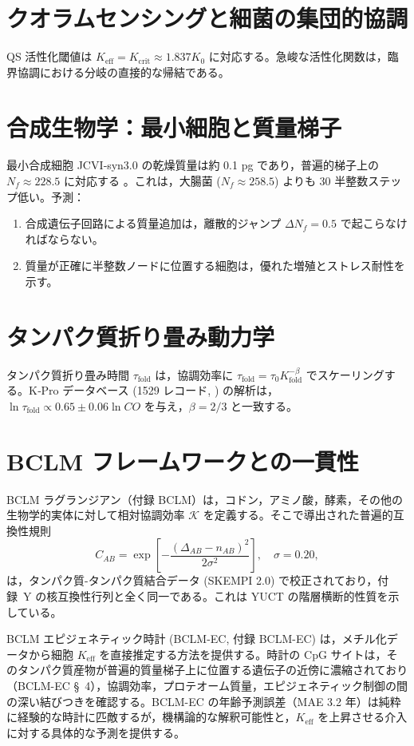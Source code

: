 \documentclass[11pt,a4paper]{article}
\newcommand{\REL}{\mathcal{K}}
\begin{document}
	\section{クオラムセンシングと細菌の集団的協調}
	
	QS 活性化閾値は \(K_{\text{eff}} = K_{\mathrm{crit}} \approx 1.837 K_0\) に対応する。急峻な活性化関数は，臨界協調における分岐の直接的な帰結である。
	
	\section{合成生物学：最小細胞と質量梯子}
	
	最小合成細胞 JCVI‑syn3.0 の乾燥質量は約 0.1 pg であり，普遍的梯子上の \(N_f \approx 228.5\) に対応する \cite{Hutchison2016, Pelletier2023}。これは，大腸菌 (\(N_f \approx 258.5\)) よりも 30 半整数ステップ低い。予測：
	\begin{enumerate}
		\item 合成遺伝子回路による質量追加は，離散的ジャンプ \(\Delta N_f = 0.5\) で起こらなければならない。
		\item 質量が正確に半整数ノードに位置する細胞は，優れた増殖とストレス耐性を示す。
	\end{enumerate}
	
	\section{タンパク質折り畳み動力学}
	
	タンパク質折り畳み時間 \(\tau_{\text{fold}}\) は，協調効率に \(\tau_{\text{fold}} = \tau_0 K_{\text{fold}}^{-\beta}\) でスケーリングする。K‑Pro データベース (1529 レコード, \cite{Turina2023}) の解析は，\(\ln \tau_{\text{fold}} \propto 0.65 \pm 0.06 \ln CO\) を与え，\(\beta=2/3\) と一致する。
	
	\section{BCLM フレームワークとの一貫性}
	
	BCLM ラグランジアン（付録 BCLM）は，コドン，アミノ酸，酵素，その他の生物学的実体に対して相対協調効率 \(\REL\) を定義する。そこで導出された普遍的互換性規則
	\[
	C_{AB} = \exp\!\left[-\frac{(\Delta_{AB}-n_{AB})^2}{2\sigma^2}\right],\quad \sigma=0.20,
	\]
	は，タンパク質-タンパク質結合データ (SKEMPI 2.0) で校正されており，付録~Y の核互換性行列と全く同一である。これは YUCT の階層横断的性質を示している。
	
	BCLM エピジェネティック時計 (BCLM-EC, 付録 BCLM-EC) は，メチル化データから細胞 \(K_{\mathrm{eff}}\) を直接推定する方法を提供する。時計の CpG サイトは，そのタンパク質産物が普遍的質量梯子上に位置する遺伝子の近傍に濃縮されており（BCLM-EC §~4），協調効率，プロテオーム質量，エピジェネティック制御の間の深い結びつきを確認する。BCLM-EC の年齢予測誤差（MAE 3.2 年）は純粋に経験的な時計に匹敵するが，機構論的な解釈可能性と，\(K_{\mathrm{eff}}\) を上昇させる介入に対する具体的な予測を提供する。
	
\end{document}

